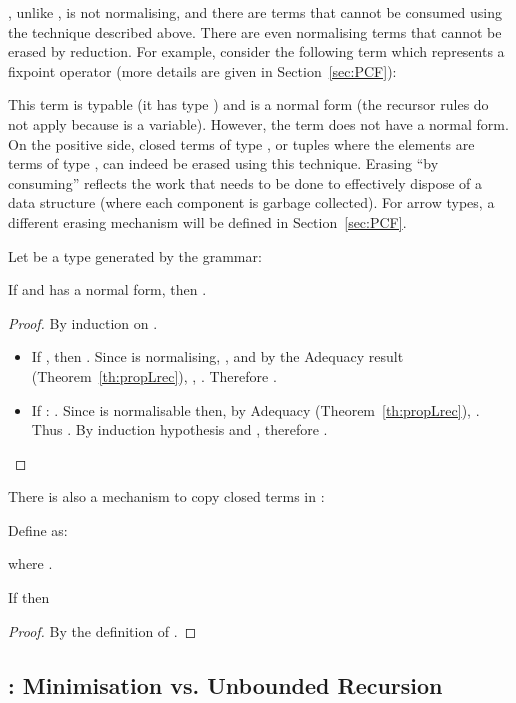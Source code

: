 \documentclass{article}
\begin{document}
, unlike \LLCI, is not normalising, and there are terms that
cannot be consumed using the technique described above. There are even
normalising terms that cannot be erased by reduction. For example,
consider the following term  which represents a fixpoint
operator (more details are given in Section~\ref{sec:PCF}):


This term is typable (it has type ) and
is a normal form (the recursor rules do not apply because  is a
variable).  However, the term 
 does
not have a normal form.  On the positive side, closed terms of type
, or tuples where the elements are terms of type , can
indeed be erased using this technique. Erasing ``by consuming''
reflects the work that needs to be done to effectively dispose of a
data structure (where each component is garbage collected).  For arrow
types, a different erasing mechanism will be defined in
Section~\ref{sec:PCF}.

\begin{theorem}
Let  be a type generated by the grammar:

If  and  has a normal form, then .
\end{theorem}
\begin{proof} 
By induction on . 
\begin{itemize}
\item If , then . Since  is normalising, , and by the Adequacy result (Theorem~\ref{th:propLrec}), , . Therefore .
\item  If 
 :  . Since  is
normalisable then,  by Adequacy
(Theorem~\ref{th:propLrec}), . Thus
. By induction hypothesis  and , therefore .
\end{itemize}
\end{proof}
There is also a mechanism to copy closed terms in :
\begin{definition}[Duplication]
\label{def:duplication-in-Lrec}
Define  as:

where .
\end{definition}

\begin{theorem}
\label{th:dupl}
If  then 
\end{theorem}
\begin{proof}
By the definition of .

\end{proof}



\subsection{\LLCIm:  Minimisation vs. Unbounded Recursion}
\label{sec:LLCIm}
\end{document}
